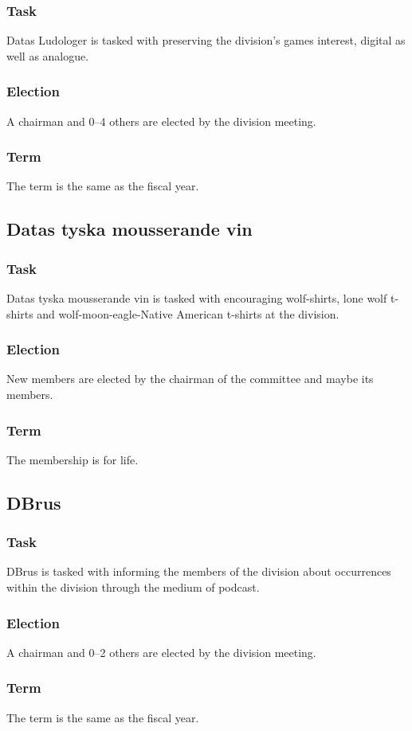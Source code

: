 \subsubsection{Task}
Datas Ludologer is tasked with preserving the division's games interest, digital as well as analogue. 
\subsubsection{Election}
A chairman and 0--4 others are elected by the division meeting. 
\subsubsection{Term}
The term is the same as the fiscal year. 

\subsection{Datas tyska mousserande vin}
\subsubsection{Task}
Datas tyska mousserande vin is tasked with encouraging wolf-shirts, lone wolf t-shirts and wolf-moon-eagle-Native American t-shirts at the division.
\subsubsection{Election}
New members are elected by the chairman of the committee and maybe its members. 
\subsubsection{Term}
The membership is for life. 

\subsection{DBrus}
\subsubsection{Task}
DBrus is tasked with informing the members of the division about occurrences within the division through the medium of podcast. 
\subsubsection{Election}
A chairman and 0--2 others are elected by the division meeting. 
\subsubsection{Term}
The term is the same as the fiscal year. 

